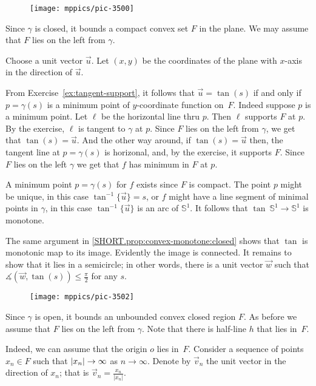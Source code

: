 \begin{wrapfigure}{r}{32 mm}
\vskip-0mm
\centering
\texttt{[image: mppics/pic-3500]}
\vskip0mm
\end{wrapfigure}

Since $\gamma$ is closed, it bounds a compact convex set $F$ in the plane.
We may assume that $F$ lies on the left from $\gamma$.

Choose a unit vector $\vec u$.
Let $(x,y)$ be the coordinates of the plane with $x$-axis in the direction of $\vec u$.

From Exercise~\ref{ex:tangent-support}, it follows that  $\vec u=\tan(s)$ if and only if $p=\gamma(s)$ is a minimum point of $y$-coordinate function on~$F$.
Indeed suppose $p$ is a minimum point.
Let $\ell$ be the horizontal line thru $p$.
Then $\ell$ supports $F$ at $p$.
By the exercise, $\ell$ is tangent to $\gamma$ at $p$.
Since $F$ lies on the left from $\gamma$, we get that $\tan(s)=\vec u$.
And the other way around, if $\tan(s)=\vec u$ then, the tangent line at $p=\gamma(s)$ is horizonal,
and, by the exercise, it supports $F$.
Since $F$ lies on the left $\gamma$ we get that $f$ has minimum in $F$ at $p$.

A minimum point $p=\gamma(s)$ for $f$ exists since $F$ is compact.
The point $p$ might be unique, in this case $\tan^{-1}\{\vec u\}=s$,
or $f$ might have a line segment of minimal points in $\gamma$, in this case $\tan^{-1}\{\vec u\}$ is an arc of $\mathbb{S}^1$.
It follows that $\tan\:\mathbb{S}^1\to \mathbb{S}^1$ is monotone.

\parit{\ref{SHORT.prop:convex-monotone:open}} 
The same argument in \ref{SHORT.prop:convex-monotone:closed} shows that $\tan$ is monotonic map to its image.
Evidently the image is connected.
It remains to show that it lies in a semicircle;
in other words, there is a unit vector $\vec w$ such that $\measuredangle(\vec w,\tan(s))\le\tfrac\pi2$ for any $s$.

\begin{figure}[ht!]
\centering
\texttt{[image: mppics/pic-3502]}
\end{figure}

Since $\gamma$ is open, it bounds an unbounded convex closed region $F$.
As before we assume that $F$ lies on the left from $\gamma$.
Note that there is half-line $h$ that lies in~$F$.

Indeed, we can assume that the origin $o$ lies in~$F$.
Consider a sequence of points $x_n\in F$ such that $|x_n|\z\to \infty$ as $n\to \infty$.
Denote by $\vec v_n$ the unit vector in the direction of $x_n$; that is $\vec v_n=\tfrac{x_n}{|x_n|}$.

